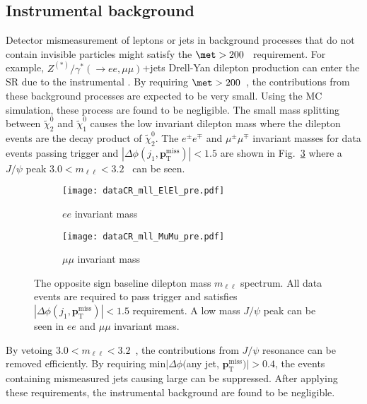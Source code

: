 
\subsection{Instrumental \met background}
\label{subsec:bkg_instrumental_met_background}
Detector mismeasurement of leptons or jets in background processes that do not contain invisible particles might satisfy the $\met > 200$~{\GeV} requirement.
For example, $Z^{(*)}/\gamma^{*}(\to ee, \mu \mu)$+jets Drell-Yan dilepton production can enter the SR due to the instrumental \met.
By requiring $\met > 200$~{\GeV}, the contributions from these background processes are expected to be very small.
Using the MC simulation, these process are found to be negligible.
The small mass splitting between $\widetilde{\chi}^{0}_{2}$ and $\widetilde{\chi}^{0}_{1}$ causes the low invariant dilepton mass where the dilepton events are the decay product of $\widetilde{\chi}^{0}_{2}$.
The $e^{\pm} e^{\mp}$ and $\mu^{\pm} \mu^{\mp}$ invariant masses for data events passing \met trigger and $|\Delta \phi(j_{1}, \mathbf{p}_\mathrm{T}^\mathrm{miss})| < 1.5$ are shown in Fig.~\ref{fig:bkg_invariant_mass} where a $J/\psi$ peak $3.0 < m_{\ell \ell} < 3.2$~{\GeV} can be seen.

\begin{figure}[htbp]
    \begin{center}
        \begin{subfigure}[b]{0.48\textwidth}
            \texttt{[image: dataCR\_mll\_ElEl\_pre.pdf]}
            \caption{$ee$ invariant mass}
            \label{fig:bkg_ee_invariant_mass}
        \end{subfigure}
        \begin{subfigure}[b]{0.48\textwidth}
            \texttt{[image: dataCR\_mll\_MuMu\_pre.pdf]}
            \caption{$\mu \mu$ invariant mass}
            \label{fig:bkg_mumu_invariant_mass}
        \end{subfigure}
        \caption{The opposite sign baseline dilepton mass $m_{\ell \ell}$ spectrum.
        All data events are required to pass \met trigger and satisfies $|\Delta \phi(j_{1}, \mathbf{p}_\mathrm{T}^\mathrm{miss})| < 1.5$ requirement.
        A low mass $J/\psi$ peak can be seen in $ee$ and $\mu \mu$ invariant mass.}
        \label{fig:bkg_invariant_mass}
    \end{center}
\end{figure}

By vetoing $3.0 < m_{\ell \ell} < 3.2$~{\GeV}, the contributions from $J/\psi$ resonance can be removed efficiently.
By requiring min$|\Delta \phi($any jet, $\mathbf{p}^{\mathrm{miss}}_{\mathrm{T}})| > 0.4$, the events containing mismeasured jets causing large \met can be suppressed.
After applying these requirements, the instrumental \met background are found to be negligible.

